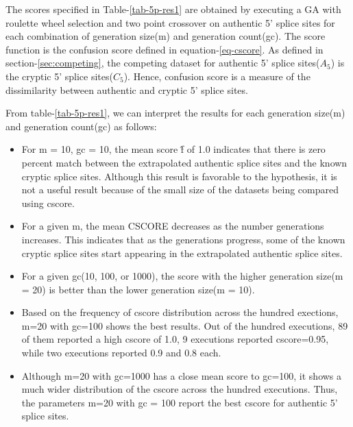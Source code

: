 The scores specified in Table-\ref{tab-5p-res1} are obtained by executing a GA with roulette wheel selection and two point crossover on authentic 5' splice sites for each combination of generation size(m) and generation count(gc). The score function is the confusion score defined in equation-\ref{eq-cscore}. As defined in section-\ref{sec:competing}, the competing dataset for authentic 5' splice sites($A_5$) is the cryptic 5' splice sites($C_5$). Hence, confusion score is a measure of the dissimilarity between authentic and cryptic 5' splice sites. \par
From table-\ref{tab-5p-res1}, we can interpret the results for each generation size(m) and generation count(gc) as follows:
\begin{itemize}
	\item For m = 10, gc = 10, the mean score \^{f} of 1.0 indicates that there is zero percent match between the extrapolated authentic splice sites and the known cryptic splice sites. Although this result is favorable to the hypothesis, it is not a useful result because of the small size of the datasets being compared using cscore.
	\item For a given m, the mean CSCORE decreases as the number generations increases. This indicates that as the generations progress, some of the known cryptic splice sites start appearing in the extrapolated authentic splice sites.
	\item For a given gc(10, 100, or 1000), the score with the higher generation size(m = 20) is better than the lower generation size(m = 10).
	\item Based on the frequency of cscore distribution across the hundred exections, m=20 with gc=100 shows the best results. Out of the hundred executions, 89 of them reported a high cscore of 1.0, 9 executions reported cscore=0.95, while two executions reported 0.9 and 0.8 each.
	\item Although m=20 with gc=1000 has a close mean score to gc=100, it shows a much wider distribution of the cscore across the hundred executions. Thus, the parameters m=20 with gc = 100 report the best cscore for authentic 5' splice sites.
\end{itemize} 

